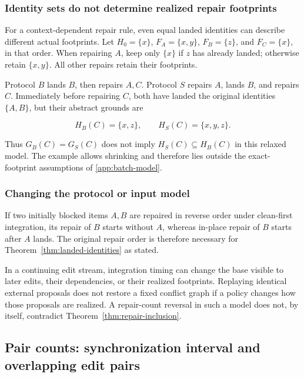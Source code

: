 \documentclass[pdflatex,sn-mathphys-ay]{sn-jnl}
\theoremstyle{thmstyleone}
\theoremstyle{thmstylethree}
\begin{document}
\begin{appendices}
\subsubsection{Identity sets do not determine realized repair footprints}\label{app:realized-footprints}

For a context-dependent repair rule, even equal landed identities can describe different actual footprints. Let \(H_0=\{x\}\), \(F_A=\{x,y\}\), \(F_B=\{z\}\), and \(F_C=\{x\}\), in that order. When repairing \(A\), keep only \(\{x\}\) if \(z\) has already landed; otherwise retain \(\{x,y\}\). All other repairs retain their footprints.

Protocol \(B\) lands \(B\), then repairs \(A,C\). Protocol \(S\) repairs \(A\), lands \(B\), and repairs \(C\). Immediately before repairing \(C\), both have landed the original identities \(\{A,B\}\), but their abstract grounds are

\[
H_B(C)=\{x,z\},
\qquad
H_S(C)=\{x,y,z\}.
\]

Thus \(G_B(C)=G_S(C)\) does not imply \(H_S(C)\subseteq H_B(C)\) in this relaxed model. The example allows shrinking and therefore lies outside the exact-footprint assumptions of \ref{app:batch-model}.

\subsubsection{Changing the protocol or input model}\label{app:protocol-limits}

If two initially blocked items \(A,B\) are repaired in reverse order under clean-first integration, its repair of \(B\) starts without \(A\), whereas in-place repair of \(B\) starts after \(A\) lands. The original repair order is therefore necessary for Theorem~\ref{thm:landed-identities} as stated.

In a continuing edit stream, integration timing can change the base visible to later edits, their dependencies, or their realized footprints. Replaying identical external proposals does not restore a fixed conflict graph if a policy changes how those proposals are realized. A repair-count reversal in such a model does not, by itself, contradict Theorem~\ref{thm:repair-inclusion}.

\subsection{Pair counts: synchronization interval and overlapping edit pairs}\label{app:overlap-pairs}


\end{appendices}
\end{document}
